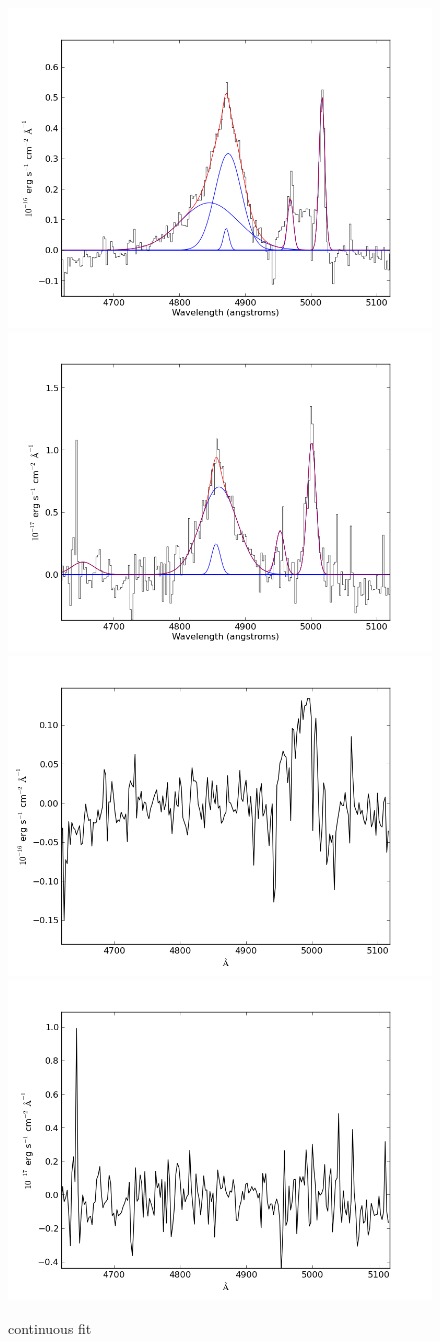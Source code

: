 \documentclass[usenatbib]{mn2e}
\begin{document}
\newpage


\begin{figure}
\begin{center}
\includegraphics[width=0.46\linewidth,angle=0]{Hbeta_4.png}
\vspace{5mm}
\includegraphics[width=0.49\linewidth,angle=0]{Hbeta_5.png}\\
\includegraphics[width=0.46\linewidth,angle=0]{Hbeta_res_4.png}
\hspace{5mm}
\includegraphics[width=0.49\linewidth,angle=0]{Hbeta_res_5.png}\\
\end{center} 
\caption{continuous fit \label{fig:landscape}}   
\end{figure}
\end{document}
